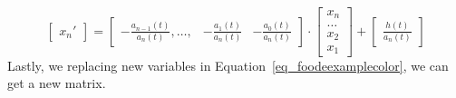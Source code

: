 \begin{equation}
  \begin{bmatrix}
		x_{n}'
	\end{bmatrix}
  = 
	\begin{bmatrix}
		-\frac{a_{n-1}(t)}{a_n(t)}, \dots, & -\frac{a_{1}(t)}{a_n(t)} & -\frac{a_{0}(t)}{a_n(t)}
	\end{bmatrix}
	\cdot
	\begin{bmatrix}
		x_{n} \\
		\dots \\
    x_{2} \\
		x_{1}  
	\end{bmatrix}
	+
	\begin{bmatrix}
		\frac{h(t)}{a_n(t)}
	\end{bmatrix}
  \nonumber
\end{equation}
Lastly, we replacing new variables in Equation~\ref{eq_foodeexamplecolor}, we can get a new matrix.
